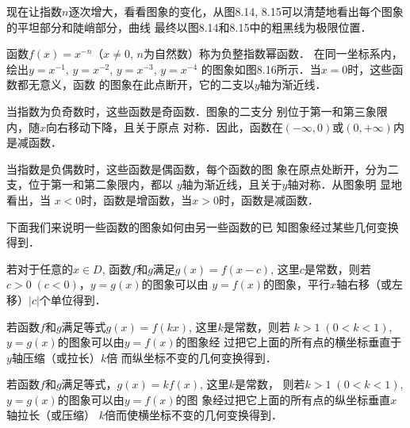 现在让指数$n$逐次增大，看看图象的变化，从图8.14,
8.15可以清楚地看出每个图象的平坦部分和陡峭部分，曲线
最终以图8.14和8.15中的粗黑线为极限位置．

函数$f(x)=x^{-n}$（$x\ne 0$, $n$为自然数）称为负整指数幂函数．
在同一坐标系内，绘出$y=x^{-1}$, $y=x^{-2}$, $y=x^{-3}$, $y=x^{-4}$
的图象如图8.16所示．当$x=0$时，这些函数都无意义，函数
的图象在此点断开，它的二支以$y$轴为渐近线．

当指数为负奇数时，这些函数是奇函数．图象的二支分
别位于第一和第三象限内，随$x$向右移动下降，且关于原点
对称．因此，函数在$(-\infty,0)$或$(0,+\infty)$内是减函数．

当指数是负偶数时，这些函数是偶函数，每个函数的图
象在原点处断开，分为二支，位于第一和第二象限内，都以
$y$轴为渐近线，且关于$y$轴对称．从图象明 显地看出，当
$x<0$时，函数是增函数，当$x>0$时，函数是减函数．

下面我们来说明一些函数的图象如何由另一些函数的已
知图象经过某些几何变换得到．

若对于任意的$x\in D$, 函数$f$和$g$满足$g(x)=f(x-c)$,
这里$c$是常数，则若$c>0\; (c<0)$，$y=g(x)$的图象可以由
$y=f(x)$的图象，平行$x$轴右移（或左移）$|c|$个单位得到．

若函数$f$和$g$满足等式$g(x)=f(kx)$, 这里$k$是常数，则若
$k>1\; (0<k<1)$, $y=g(x)$的图象可以由$y=f(x)$的图象经
过把它上面的所有点的横坐标垂直于$y$轴压缩（或拉长）$k$倍
而纵坐标不变的几何变换得到．

若函数$f$和$g$满足等式，$g(x)=kf(x)$, 这里$k$是常数，
则若$k>1\; (0<k<1)$, $y=g(x)$的图象可以由$y=f(x)$的图
象经过把它上面的所有点的纵坐标垂直$x$轴拉长（或压缩）
$k$倍而使横坐标不变的几何变换得到．


